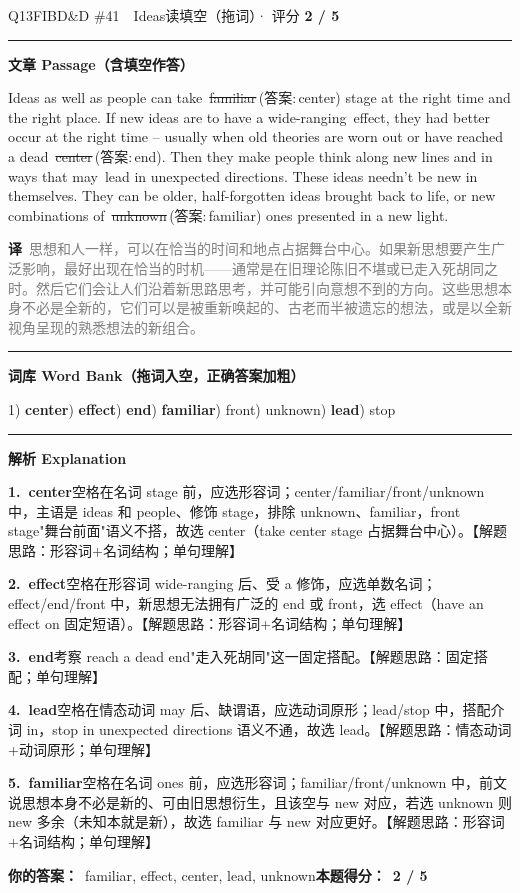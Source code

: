 \documentclass[11pt]{article}
\newcommand{\ptesub}[1]{%
  \par\needspace{2\baselineskip}\smallskip
  {\color{cAccent}\rule[-0.2ex]{3pt}{1.05em}}\hspace{6pt}%
  {\bfseries\color{cHead}#1}\par\nopagebreak\smallskip}
\newcommand{\zh}[1]{{\footnotesize\textcolor{cNote}{\textbf{译}}\ \textcolor{gray}{#1}}}
\newcommand{\rok}[1]{{\color{cFix}\ding{51}\,#1}}                 %
\newcommand{\rno}[2]{{\color{cWrong}\ding{55}\,\sout{#1}}\,{\footnotesize\color{cFix}(答案:\,#2)}}  %
\begin{document}
\begin{qblock}{Q13\quad FIBD\&D \#41\ \ Ideas}{读填空（拖词）· 评分 \textcolor{cAccent}{\bfseries 2 / 5}}
\ptesub{文章 Passage（含填空作答）}
\begin{promptbox}
Ideas as well as people can take \rno{familiar}{center} stage at the right time and the right place. If new ideas are to have a wide-ranging \rok{effect}, they had better occur at the right time -- usually when old theories are worn out or have reached a dead \rno{center}{end}. Then they make people think along new lines and in ways that may \rok{lead} in unexpected directions. These ideas needn't be new in themselves. They can be older, half-forgotten ideas brought back to life, or new combinations of \rno{unknown}{familiar} ones presented in a new light.
\end{promptbox}
\zh{思想和人一样，可以在恰当的时间和地点占据舞台中心。如果新思想要产生广泛影响，最好出现在恰当的时机——通常是在旧理论陈旧不堪或已走入死胡同之时。然后它们会让人们沿着新思路思考，并可能引向意想不到的方向。这些思想本身不必是全新的，它们可以是被重新唤起的、古老而半被遗忘的想法，或是以全新视角呈现的熟悉想法的新组合。}
\ptesub{词库 Word Bank（拖词入空，正确答案加粗）}
{\small 1) \textbf{center}) \textbf{effect}) \textbf{end}) \textbf{familiar}) front) unknown) \textbf{lead}) stop}
\ptesub{解析 Explanation}
\begin{notebox}\footnotesize
\textbf{1.\ center}\quad 空格在名词 stage 前，应选形容词；center/familiar/front/unknown 中，主语是 ideas 和 people、修饰 stage，排除 unknown、familiar，front stage"舞台前面"语义不搭，故选 center（take center stage 占据舞台中心）。【解题思路：形容词+名词结构；单句理解】\par\smallskip
\textbf{2.\ effect}\quad 空格在形容词 wide-ranging 后、受 a 修饰，应选单数名词；effect/end/front 中，新思想无法拥有广泛的 end 或 front，选 effect（have an effect on 固定短语）。【解题思路：形容词+名词结构；单句理解】\par\smallskip
\textbf{3.\ end}\quad 考察 reach a dead end"走入死胡同"这一固定搭配。【解题思路：固定搭配；单句理解】\par\smallskip
\textbf{4.\ lead}\quad 空格在情态动词 may 后、缺谓语，应选动词原形；lead/stop 中，搭配介词 in，stop in unexpected directions 语义不通，故选 lead。【解题思路：情态动词+动词原形；单句理解】\par\smallskip
\textbf{5.\ familiar}\quad 空格在名词 ones 前，应选形容词；familiar/front/unknown 中，前文说思想本身不必是新的、可由旧思想衍生，且该空与 new 对应，若选 unknown 则 new 多余（未知本就是新），故选 familiar 与 new 对应更好。【解题思路：形容词+名词结构；单句理解】
\end{notebox}
\smallskip
\textbf{你的答案：}\ {\color{cWrong}familiar}, effect, {\color{cWrong}center}, lead, {\color{cWrong}unknown}\qquad\textbf{本题得分：}\ {\color{cAccent}\bfseries 2 / 5}
\end{qblock}
\end{document}
